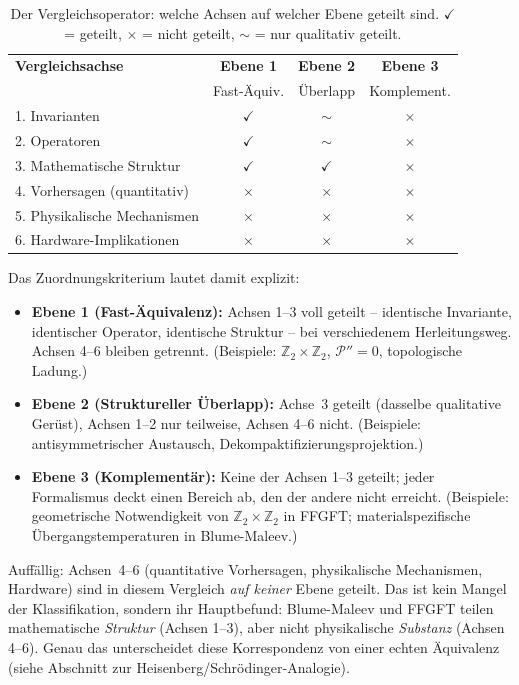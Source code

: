 \begin{table}[htbp]
\centering
\caption{Der Vergleichsoperator: welche Achsen auf welcher Ebene geteilt
sind. $\checkmark$ = geteilt, $\times$ = nicht geteilt, $\sim$ = nur
qualitativ geteilt.}
\label{tab:operator}
\begin{tabular}{p{5.5cm}ccc}
\toprule
\textbf{Vergleichsachse} & \textbf{Ebene 1} & \textbf{Ebene 2} & \textbf{Ebene 3} \\
 & Fast-Äquiv. & Überlapp & Komplement. \\
\midrule
1. Invarianten          & $\checkmark$ & $\sim$       & $\times$ \\
2. Operatoren           & $\checkmark$ & $\sim$       & $\times$ \\
3. Mathematische Struktur & $\checkmark$ & $\checkmark$ & $\times$ \\
4. Vorhersagen (quantitativ) & $\times$  & $\times$     & $\times$ \\
5. Physikalische Mechanismen & $\times$  & $\times$     & $\times$ \\
6. Hardware-Implikationen & $\times$    & $\times$     & $\times$ \\
\bottomrule
\end{tabular}
\end{table}

\noindent Das Zuordnungskriterium lautet damit explizit:
\begin{itemize}
  \item \textbf{Ebene 1 (Fast-Äquivalenz):} Achsen 1--3 voll geteilt --
        identische Invariante, identischer Operator, identische Struktur --
        bei verschiedenem Herleitungsweg. Achsen 4--6 bleiben getrennt.
        (Beispiele: $\mathbb{Z}_2\times\mathbb{Z}_2$, $\mathcal{P}''=0$,
        topologische Ladung.)
  \item \textbf{Ebene 2 (Struktureller Überlapp):} Achse~3 geteilt
        (dasselbe qualitative Gerüst), Achsen 1--2 nur teilweise, Achsen
        4--6 nicht. (Beispiele: antisymmetrischer Austausch,
        Dekompaktifizierungsprojektion.)
  \item \textbf{Ebene 3 (Komplementär):} Keine der Achsen 1--3 geteilt;
        jeder Formalismus deckt einen Bereich ab, den der andere nicht
        erreicht. (Beispiele: geometrische Notwendigkeit von
        $\mathbb{Z}_2\times\mathbb{Z}_2$ in FFGFT; materialspezifische
        Übergangstemperaturen in Blume-Maleev.)
\end{itemize}

Auffällig: Achsen~4--6 (quantitative Vorhersagen, physikalische
Mechanismen, Hardware) sind in diesem Vergleich \emph{auf keiner} Ebene
geteilt. Das ist kein Mangel der Klassifikation, sondern ihr Hauptbefund:
Blume-Maleev und FFGFT teilen mathematische \emph{Struktur} (Achsen 1--3),
aber nicht physikalische \emph{Substanz} (Achsen 4--6). Genau das
unterscheidet diese Korrespondenz von einer echten Äquivalenz
(siehe Abschnitt zur Heisenberg/Schrödinger-Analogie).

